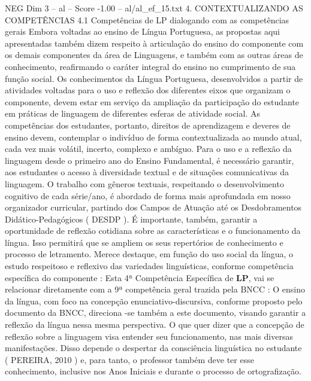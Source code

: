 \begin{textsample}{NEG Dim 3 – al – Score -1.00 – al/al\_ef\_15.txt}  \label{ex:f3_neg_074}
4.
CONTEXTUALIZANDO AS COMPETÊNCIAS 4.1 Competências de LP dialogando com as competências gerais Embora voltadas ao ensino de Língua Portuguesa, as propostas aqui apresentadas também dizem respeito à articulação do ensino do componente com os demais componentes da área de Linguagens, e também com as outras áreas de conhecimento, reafirmando o caráter integral do ensino no cumprimento de sua função social.
Os conhecimentos da Língua Portuguesa, desenvolvidos a partir de atividades voltadas para o uso e reflexão dos diferentes eixos que organizam o componente, devem estar em serviço da ampliação da participação do estudante em práticas de linguagem de diferentes esferas de atividade social.
As competências dos estudantes, portanto, direitos de aprendizagem e deveres de ensino devem, contemplar o indivíduo de forma contextualizada ao mundo atual, cada vez mais volátil, incerto, complexo e ambíguo.
Para o uso e a reflexão da linguagem desde o primeiro ano do Ensino Fundamental, é necessário garantir, aos estudantes o acesso à diversidade textual e de situações comunicativas da linguagem.
O trabalho com gêneros textuais, respeitando o desenvolvimento cognitivo de cada série/ano, é abordado de forma mais aprofundada em nosso organizador curricular, partindo dos Campos de Atuação até os Desdobramentos Didático-Pedagógicos ( DESDP ).
É importante, também, garantir a oportunidade de reflexão cotidiana sobre as características e o funcionamento da língua.
Isso permitirá que se ampliem os seus repertórios de conhecimento e processo de letramento.
Merece destaque, em função do uso social da língua, o estudo respeitoso e reflexivo das variedades linguísticas, conforme competência específica do componente : Esta 4ª Competência Específica de \textbf{LP}, vai se relacionar diretamente com a 9ª competência geral trazida pela BNCC : O ensino da língua, com foco na concepção enunciativo-discursiva, conforme proposto pelo documento da BNCC, direciona -se também a este documento, visando garantir a reflexão da língua nessa mesma perspectiva.
O que quer dizer que a concepção de reflexão sobre a linguagem visa entender seu funcionamento, nas mais diversas manifestações.
Disso depende o despertar da consciência linguística no estudante ( PEREIRA, 2010 ) e, para tanto, o professor também deve ter esse conhecimento, inclusive nos Anos Iniciais e durante o processo de ortografização.

\end{textsample}
